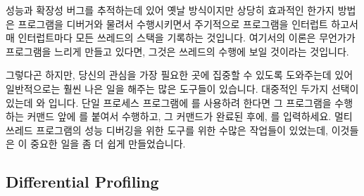 성능과 확장성 버그를 추적하는데 있어 옛날 방식이지만 상당히 효과적인 한가지
방법은 프로그램을 디버거와 물려서 수행시키면서 주기적으로 프로그램을 인터럽트
하고서 매 인터럽트마다 모든 쓰레드의 스택을 기록하는 것입니다.
여기서의 이론은 무언가가 프로그램을 느리게 만들고 있다면, 그것은 쓰레드의
수행에 보일 것이라는 것입니다.

그렇다곤 하지만, 당신의 관심을 가장 필요한 곳에 집중할 수 있도록 도와주는데
있어 일반적으로는 훨씬 나은 일을 해주는 많은 도구들이 있습니다.
대중적인 두가지 선택이 있는데  와  입니다.
단일 프로세스 프로그램에  를 사용하려 한다면 그 프로그램을 수행하는
커맨드 앞에  를 붙여서 수행하고, 그 커맨드가 완료된 후에,
 를 입력하세요.
멀티 쓰레드 프로그램의 성능 디버깅을 위한 도구를 위한 수많은 작업들이 있었는데,
이것들은 이 중요한 일을 좀 더 쉽게 만들었습니다.

\subsection{Differential Profiling}
\label{sec:debugging:Differential Profiling}

